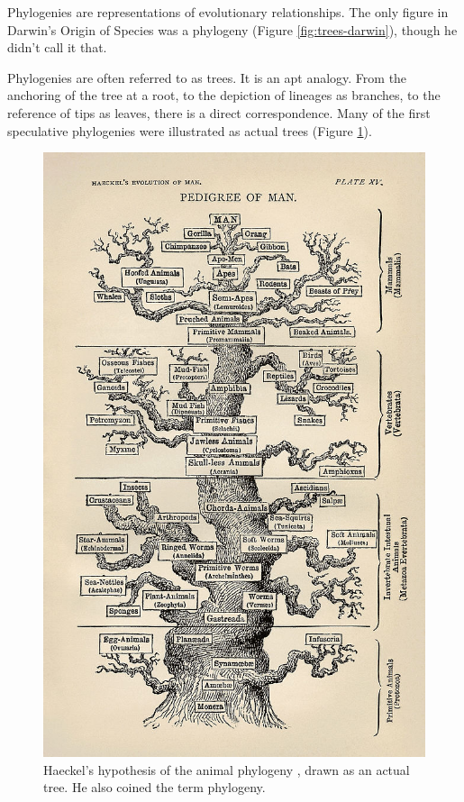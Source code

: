 \documentclass[
]{book}
\begin{document}
Phylogenies are representations of evolutionary relationships. The only figure in Darwin's Origin of Species was a phylogeny (Figure \ref{fig:trees-darwin}), though he didn't call it that.

Phylogenies are often referred to as trees. It is an apt analogy. From the anchoring of the tree at a root, to the depiction of lineages as branches, to the reference of tips as leaves, there is a direct correspondence. Many of the first speculative phylogenies were illustrated as actual trees (Figure \ref{fig:trees-haeckel}).

\begin{figure}
\centering
\includegraphics{figures/haeckel.jpg}
\caption{\label{fig:trees-haeckel}Haeckel's hypothesis of the animal phylogeny \citep{haeckel1897}, drawn as an actual tree. He also coined the term phylogeny.}
\end{figure}
\end{document}

